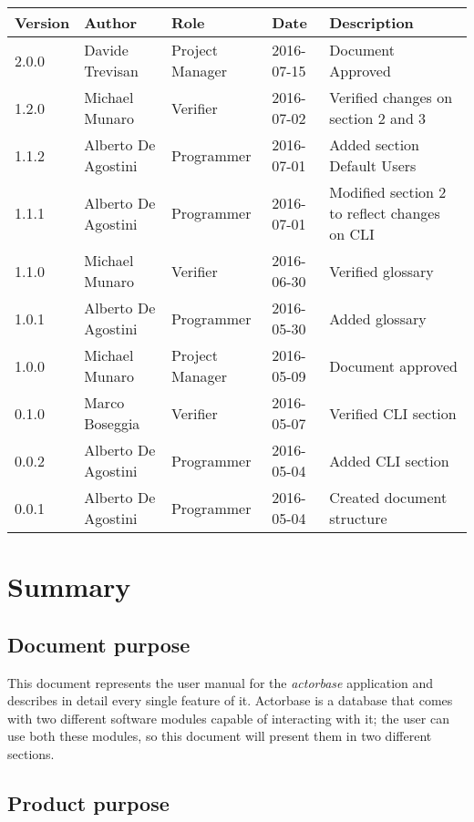 \documentclass{scalatekids-article}
\begin{document}
\begin{center}
  \begin{longtable}{| l | l | l | l | p{5cm} |}
    \hline
    Version & Author & Role & Date & Description \\
    \hline
    2.0.0 & Davide Trevisan & Project Manager & 2016-07-15 & Document Approved\\
    \hline
    1.2.0 & Michael Munaro & Verifier & 2016-07-02 & Verified changes on section 2 and 3\\
    \hline
    1.1.2 & Alberto De Agostini & Programmer & 2016-07-01 & Added section Default Users\\
    \hline
    1.1.1 & Alberto De Agostini & Programmer & 2016-07-01 & Modified section 2 to reflect changes on CLI\\
    \hline
    1.1.0 & Michael Munaro & Verifier & 2016-06-30 & Verified glossary\\
    \hline
    1.0.1 & Alberto De Agostini & Programmer & 2016-05-30 & Added glossary\\
    \hline
    1.0.0 & Michael Munaro & Project Manager & 2016-05-09 & Document approved\\
    \hline
    0.1.0 & Marco Boseggia & Verifier & 2016-05-07 & Verified CLI section\\
    \hline
    0.0.2 & Alberto De Agostini & Programmer & 2016-05-04 & Added CLI section\\
    \hline
    0.0.1 & Alberto De Agostini & Programmer & 2016-05-04 & Created document structure\\
    \hline
  \end{longtable}
\end{center}
\tableofcontents
\newpage
{}
\section{Summary}

\subsection{Document purpose}
This document represents the user manual for the \textit{actorbase} application
and describes in detail every single feature of it. Actorbase is a database that
comes with two different software modules capable of interacting with it; the
user can use both these modules, so this document will present them in two
different sections.

\subsection{Product purpose}
\end{document}
